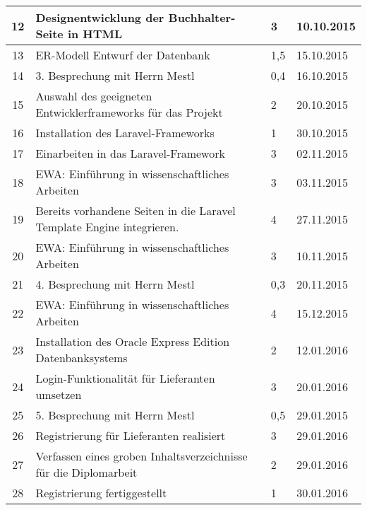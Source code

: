 \begin{longtable}[h]{| c | p{11.6cm} | l | l |}
12 & Designentwicklung der Buchhalter-Seite in HTML & 3 & 10.10.2015 \\ \hline

13 & ER-Modell Entwurf der Datenbank & 1,5 & 15.10.2015 \\ \hline

14 & 3. Besprechung mit Herrn Mestl & 0,4 & 16.10.2015 \\ \hline

15 & Auswahl des geeigneten Entwicklerframeworks für das Projekt & 2 &  20.10.2015 \\ \hline

16 & Installation des Laravel-Frameworks & 1 &  30.10.2015 \\ \hline

17 & Einarbeiten in das Laravel-Framework & 3 & 02.11.2015 \\ \hline

18 & EWA: Einführung in wissenschaftliches Arbeiten & 3 & 03.11.2015 \\ \hline

19 & Bereits vorhandene Seiten in die Laravel Template Engine integrieren. & 4 & 27.11.2015 \\ \hline

20 & EWA: Einführung in wissenschaftliches Arbeiten & 3 & 10.11.2015 \\ \hline

21 & 4. Besprechung mit Herrn Mestl & 0,3 & 20.11.2015 \\ \hline

22 & EWA: Einführung in wissenschaftliches Arbeiten & 4 & 15.12.2015 \\ \hline

23 & Installation des Oracle Express Edition Datenbanksystems & 2 & 12.01.2016 \\ \hline

24 & Login-Funktionalität für Lieferanten umsetzen & 3 & 20.01.2016 \\ \hline

25 & 5. Besprechung mit Herrn Mestl & 0,5 & 29.01.2015 \\ \hline

26 & Registrierung für Lieferanten realisiert & 3 & 29.01.2016 \\ \hline

27 & Verfassen eines groben Inhaltsverzeichnisse für die Diplomarbeit & 2 &  29.01.2016 \\ \hline

28 & Registrierung fertiggestellt & 1 & 30.01.2016 \\ \hline


\end{longtable}
